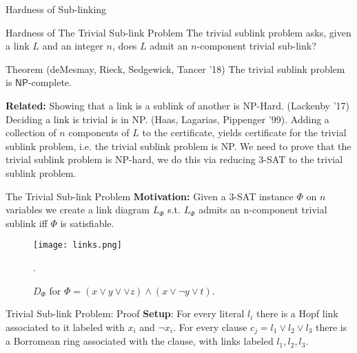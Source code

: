 \documentclass{beamer}
\begin{document}
\begin{section}{Hardness of Sub-linking}
\begin{frame}{Hardness of The Trivial Sub-link Problem}
        The trivial sublink problem asks, given a link $L$ and an integer $n$, does $L$ admit an $n$-component trivial sub-link?
        \begin{block}{Theorem (deMesmay, Rieck, Sedgewick, Tancer '18)}
            The trivial sublink problem is $\mathsf{NP}$-complete.
        \end{block}{}
        \textbf{Related:} Showing that a link is a sublink of another is NP-Hard. (Lackenby '17)
        \newline
        \newline
        Deciding a link is trivial is in NP. (Haas, Lagarias, Pippenger '99). Adding a collection of $n$ components of $L$ to the certificate, yields certificate for the trivial sublink problem, i.e. the trivial sublink problem is NP.
        \newline
        \newline
        We need to prove that the trivial sublink problem is NP-hard, we do this via reducing 3-SAT to the trivial sublink problem.
        
        
\end{frame}{}
    
\begin{frame}{The Trivial Sub-link Problem}
        \textbf{Motivation:} Given a 3-SAT instance $\Phi$ on $n$ variables we create a link diagram $L_\Phi$ s.t. $L_\Phi$ admits an n-component trivial sublink iff $\Phi$ is satisfiable.
        \begin{figure}
            \texttt{[image: links.png]}
            \caption{$D_\Phi$ for $\Phi=(x\lor y \lor \lor z)\land (x\lor \neg y \lor t)$.}.
        \end{figure}
\end{frame}{}   
    
\begin{frame}{Trivial Sub-link Problem: Proof}
        \textbf{Setup}: For every literal $l_i$ there is a Hopf link associated to it labeled with $x_i$ and $\neg x_i$. For every clause $c_j= l_1 \lor l_2 \lor l_3$ there is a Borromean ring associated with the clause, with links labeled $l_1,l_2,l_3$. 
        

\end{frame}
\end{section}
\end{document}
